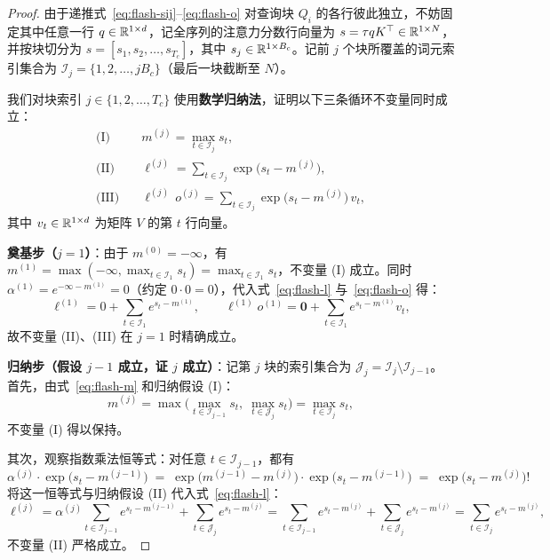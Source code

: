 \begin{proof}
由于递推式~\eqref{eq:flash-sij}--\eqref{eq:flash-o} 对查询块 $Q_i$ 的各行彼此独立，不妨固定其中任意一行 $q \in \mathbb{R}^{1 \times d}$，记全序列的注意力分数行向量为 $s = \tau q K^\top \in \mathbb{R}^{1 \times N}$，并按块切分为 $s = [s_1, s_2, \dots, s_{T_c}]$，其中 $s_j \in \mathbb{R}^{1 \times B_c}$。记前 $j$ 个块所覆盖的词元索引集合为 $\mathcal{I}_j = \{1, 2, \dots, j B_c\}$（最后一块截断至 $N$）。

我们对块索引 $j \in \{1, 2, \dots, T_c\}$ 使用\textbf{数学归纳法}，证明以下三条循环不变量同时成立：
\begin{align*}
  \text{(I)}\quad & m^{(j)} = \max_{t \in \mathcal{I}_j} s_t, \\
  \text{(II)}\quad & \ell^{(j)} = \sum_{t \in \mathcal{I}_j} \exp\!\big(s_t - m^{(j)}\big), \\
  \text{(III)}\quad & \ell^{(j)}\, o^{(j)} = \sum_{t \in \mathcal{I}_j} \exp\!\big(s_t - m^{(j)}\big)\, v_t,
\end{align*}
其中 $v_t \in \mathbb{R}^{1 \times d}$ 为矩阵 $V$ 的第 $t$ 行向量。

\textbf{奠基步（$j = 1$）}：由于 $m^{(0)} = -\infty$，有 $m^{(1)} = \max(-\infty, \max_{t \in \mathcal{I}_1} s_t) = \max_{t \in \mathcal{I}_1} s_t$，不变量 (I) 成立。同时 $\alpha^{(1)} = e^{-\infty - m^{(1)}} = 0$（约定 $0 \cdot 0 = 0$），代入式~\eqref{eq:flash-l} 与~\eqref{eq:flash-o} 得：
\[
  \ell^{(1)} = 0 + \sum_{t \in \mathcal{I}_1} e^{s_t - m^{(1)}}, \qquad
  \ell^{(1)} o^{(1)} = \mathbf{0} + \sum_{t \in \mathcal{I}_1} e^{s_t - m^{(1)}} v_t,
\]
故不变量 (II)、(III) 在 $j = 1$ 时精确成立。

\textbf{归纳步（假设 $j - 1$ 成立，证 $j$ 成立）}：记第 $j$ 块的索引集合为 $\mathcal{J}_j = \mathcal{I}_j \setminus \mathcal{I}_{j-1}$。
首先，由式~\eqref{eq:flash-m} 和归纳假设 (I)：
\[
  m^{(j)} = \max\!\Big(\max_{t \in \mathcal{I}_{j-1}} s_t,\; \max_{t \in \mathcal{J}_j} s_t\Big) = \max_{t \in \mathcal{I}_j} s_t,
\]
不变量 (I) 得以保持。

其次，观察指数乘法恒等式：对任意 $t \in \mathcal{I}_{j-1}$，都有
\[
  \alpha^{(j)} \cdot \exp\!\big(s_t - m^{(j-1)}\big)
  \;=\; \exp\!\big(m^{(j-1)} - m^{(j)}\big) \cdot \exp\!\big(s_t - m^{(j-1)}\big)
  \;=\; \exp\!\big(s_t - m^{(j)}\big)!
\]
将这一恒等式与归纳假设 (II) 代入式~\eqref{eq:flash-l}：
\[
  \ell^{(j)}
  = \alpha^{(j)} \sum_{t \in \mathcal{I}_{j-1}} e^{s_t - m^{(j-1)}} + \sum_{t \in \mathcal{J}_j} e^{s_t - m^{(j)}}
  = \sum_{t \in \mathcal{I}_{j-1}} e^{s_t - m^{(j)}} + \sum_{t \in \mathcal{J}_j} e^{s_t - m^{(j)}}
  = \sum_{t \in \mathcal{I}_j} e^{s_t - m^{(j)}},
\]
不变量 (II) 严格成立。


\end{proof}
